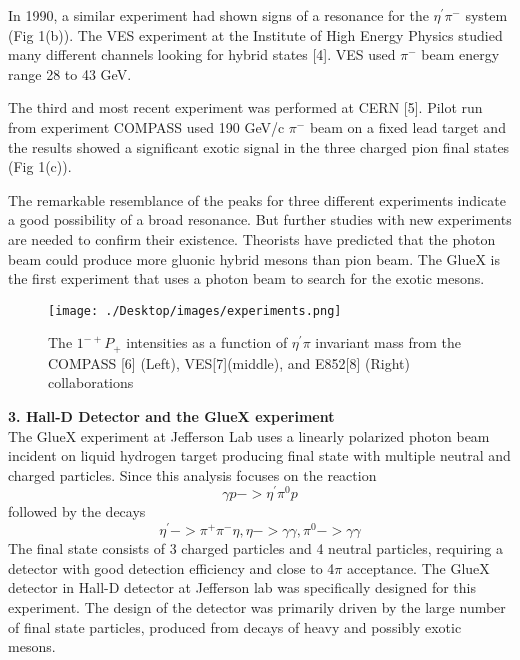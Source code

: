 \documentclass[11pt]{article}
\begin{document}
In 1990, a similar experiment had shown signs of a resonance for the  $\eta^{'}\pi^{-}$ system (Fig 1(b)). The VES experiment at the Institute of High Energy Physics studied many different channels looking for hybrid states [4]. VES used $\pi^{-}$ beam energy range 28 to 43 GeV.

The third and most recent experiment was performed at CERN [5]. Pilot run from experiment COMPASS used 190 GeV/c $\pi^{-}$ beam on a fixed lead target and the results showed a significant exotic signal in the three charged pion final states (Fig 1(c)).

The remarkable resemblance of the peaks for three different experiments indicate a good possibility of a broad resonance. But further studies with new experiments are needed to confirm their existence. Theorists have predicted that the photon beam could produce more gluonic hybrid mesons than pion beam. The GlueX is the first experiment that uses a photon beam to search for the exotic mesons.\\

\begin{figure}
  \texttt{[image: ./Desktop/images/experiments.png]}
  \caption{The $1^{-+} P_{+}$ intensities as a function of $\eta^{'}\pi$ invariant mass from the COMPASS [6] (Left), VES[7](middle), and E852[8] (Right) collaborations}
  \label{fig:boat1}
\end{figure}








 
 \textbf {3. Hall-D Detector and the GlueX experiment}\\
 
 The GlueX experiment at Jefferson Lab uses a linearly polarized photon beam incident on liquid hydrogen target producing final state with multiple neutral and charged particles. Since this analysis focuses on the reaction $$\gamma p->\eta^{'}\pi^{0}p$$ followed by the decays $$\eta^{'}->\pi^{+}\pi^{-}\eta, \eta->\gamma\gamma,\pi^{0}->\gamma\gamma$$
The final state consists of 3 charged particles and 4 neutral particles, requiring a detector with good detection efficiency and close to 4$\pi$ acceptance. 
The GlueX detector in Hall-D detector at Jefferson lab was specifically designed for this experiment. 
The design of the detector was primarily driven by the large number of final state particles, produced from decays of heavy and possibly exotic mesons.
\end{document}
